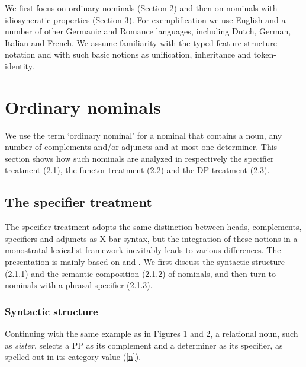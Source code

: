 \documentclass[output=paper]{langsci/langscibook}
\begin{document}
We first focus on ordinary nominals (Section 2) and then on nominals with idiosyncratic 
properties (Section 3). For exemplification we use English and a number of other Germanic 
and Romance languages, including Dutch, German, Italian and French.  
We assume familiarity with the typed feature structure notation and with such basic notions 
as unification, inheritance and token-identity. 
    

\section{Ordinary nominals} 


We use the term `ordinary nominal' for a nominal that contains a noun, 
any number of complements and/or adjuncts and at most one determiner. 
This section shows how such nominals are analyzed in respectively the 
specifier treatment (2.1), the functor treatment (2.2) and the DP treatment (2.3).  

    
\subsection{The specifier treatment} 


The specifier treatment adopts the same distinction between heads, complements, 
specifiers and adjuncts as X-bar syntax, but the integration of these notions 
in a monostratal lexicalist framework inevitably leads to various differences. 
The presentation is mainly based on \citet{ps2} and \citet{GS00}. 
We first discuss the syntactic structure (2.1.1) and the semantic composition (2.1.2) 
of nominals, and then turn to nominals with a phrasal specifier (2.1.3). 


\subsubsection{Syntactic structure}


Continuing with the same example as in Figures 1 and 2, 
a relational noun, such as \emph{sister}, selects a PP as its complement 
and a determiner as its specifier, as spelled out in its {\sc category} value
(\ref{n}). 

\begin{exe} 
\ex\label{n}
\begin{avm}
\end{avm}
\end{exe}
\end{document}
